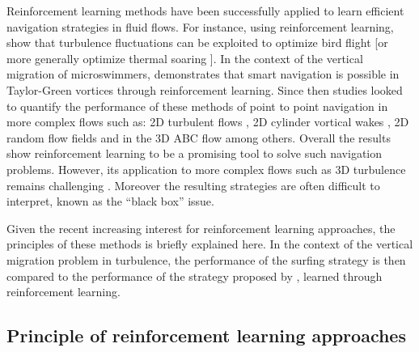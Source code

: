 Reinforcement learning methods have been successfully applied to learn efficient navigation strategies in fluid flows.
For instance, using reinforcement learning, \citet{reddy2016learning} show that turbulence fluctuations can be exploited to optimize bird flight [or more generally optimize thermal soaring \citep{reddy2018glider, reddy2018soaring}].
In the context of the vertical migration of microswimmers, \citet{colabrese2017flow} demonstrates that smart navigation is possible in Taylor-Green vortices through reinforcement learning.
Since then studies looked to quantify the performance of these methods of point to point navigation in more complex flows such as: 2D turbulent flows \citep{biferale2019zermelo, alageshan2020machine, qiu2022navigation}, 2D cylinder vortical wakes \citep{gunnarson2021learning}, 2D random flow fields \citep{qiu2022navigation} and in the 3D ABC flow \citep{gustavsson2017finding} among others.
Overall the results show reinforcement learning to be a promising tool to solve such navigation problems.
However, its application to more complex flows such as 3D turbulence remains challenging \citep{alageshan2020machine}.
Moreover the resulting strategies are often difficult to interpret, known as the ``black box'' issue.


Given the recent increasing interest for reinforcement learning approaches, the principles of these methods is briefly explained here. 
In the context of the vertical migration problem in turbulence, the performance of the surfing strategy is then compared to the performance of the strategy proposed by \citet{alageshan2020machine}, learned through reinforcement learning.

\subsection{Principle of reinforcement learning approaches}

